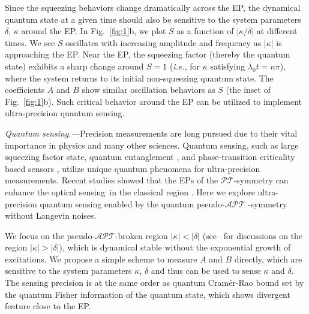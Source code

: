 \documentclass[twocolumn,prl,floatfix,citeautoscript,nofootinbib,superscriptaddress]{revtex4}
\begin{document}
Since the squeezing behaviors change dramatically across the EP, the
dynamical quantum state at a given time should also be sensitive to the
system parameters $\delta $, $\kappa $ around the EP. In Fig.~\ref{fig:1}b,
we plot $S$ as a function of $|\kappa /\delta |$ at different times. We see $%
S$ oscillates with increasing amplitude and frequency as $|\kappa |$ is
approaching the EP. Near the EP, the squeezing factor (thereby the quantum
state) exhibits a sharp change around $S=1$ (\textit{i.e.}, for $\kappa $
satisfying $\lambda _{0}t=n\pi $), where the system returns to its initial
non-squeezing quantum state. The coefficients $A$ and $B$ show similar
oscillation behaviors as $S$ (the inset of Fig.~\ref{fig:1}b). Such critical
behavior around the EP can be utilized to implement ultra-precision quantum
sensing.

\emph{{\color{blue}Quantum sensing}.---}Precision measurements are long
pursued due to their vital importance in physics and many other sciences.
Quantum sensing, such as large squeezing factor state, quantum entanglement
\cite{nphoton.2011.35,RevModPhys.90.035005}, and phase-transition
criticality based sensors \cite%
{PhysRevA.88.021801,NJP.17,PhysRevA.93.022103,PhysRevLett.126.010502,PhysRevLett.124.120504,PhysRevX.8.021022}%
, utilize unique quantum phenomena for ultra-precision measurements. Recent
studies showed that the EPs of the $\mathcal{PT}$-symmetry can enhance the
optical sensing~in the classical region \cite{PRJ.396115}. Here we explore
ultra-precision quantum sensing enabled by the quantum pseudo-$\mathcal{APT}$%
-symmetry without Langevin noises.

We focus on the pseudo-$\mathcal{APT}$-broken region $|\kappa |<|\delta |$
(see~\cite{SM} for discussions on the region $|\kappa |>|\delta |$), which
is dynamical stable without the exponential growth of excitations. We
propose a simple scheme to measure $A$ and $B$ directly, which are sensitive
to the system parameters $\kappa $, $\delta $ and thus can be used to sense $%
\kappa $ and $\delta $. The sensing precision is at the same order as
quantum Cram\'{e}r-Rao bound set by the quantum Fisher information of the
quantum state, which shows divergent feature close to the EP.
\end{document}
